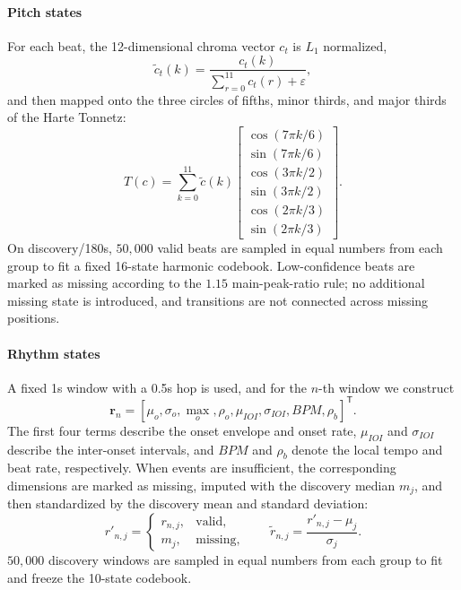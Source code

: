 \documentclass{article}
\begin{document}
\paragraph{Pitch states}
For each beat, the 12-dimensional chroma vector $c_t$ is $L_1$ normalized,
\[\widetilde c_t(k)=\frac{c_t(k)}{\sum_{r=0}^{11}c_t(r)+\varepsilon},\]
and then mapped onto the three circles of fifths, minor thirds, and major thirds of the Harte Tonnetz:
\[
T(c)=\sum_{k=0}^{11}\widetilde c(k)
\begin{bmatrix}
\cos(7\pi k/6)\\ \sin(7\pi k/6)\\
\cos(3\pi k/2)\\ \sin(3\pi k/2)\\
\cos(2\pi k/3)\\ \sin(2\pi k/3)
\end{bmatrix}.
\]
On discovery/180s, $50{,}000$ valid beats are sampled in equal numbers from each group to fit a fixed 16-state harmonic codebook. Low-confidence beats are marked as missing according to the $1.15$ main-peak-ratio rule; no additional missing state is introduced, and transitions are not connected across missing positions.

\paragraph{Rhythm states}
A fixed 1s window with a 0.5s hop is used, and for the $n$-th window we construct
\[\mathbf r_n=[\mu_o,\sigma_o,\operatorname{max}_o,\rho_o,\mu_{IOI},\sigma_{IOI},BPM,\rho_b]^\mathsf T.\]
The first four terms describe the onset envelope and onset rate, $\mu_{IOI}$ and $\sigma_{IOI}$ describe the inter-onset intervals, and $BPM$ and $\rho_b$ denote the local tempo and beat rate, respectively. When events are insufficient, the corresponding dimensions are marked as missing, imputed with the discovery median $m_j$, and then standardized by the discovery mean and standard deviation:
\[
r'_{n,j}=\begin{cases}r_{n,j},&\text{valid},\\m_j,&\text{missing},\end{cases}
\qquad
\widetilde r_{n,j}=\frac{r'_{n,j}-\mu_j}{\sigma_j}.
\]
$50{,}000$ discovery windows are sampled in equal numbers from each group to fit and freeze the 10-state codebook.
\end{document}
